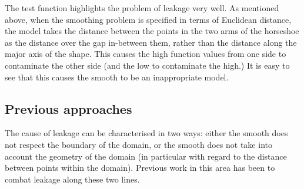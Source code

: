 \documentclass[10pt]{article}
\begin{document}
The test function highlights the problem of leakage very well. As mentioned above, when the smoothing problem is specified in terms of Euclidean distance, the model takes the distance between the points in the two arms of the horseshoe as the distance over the gap in-between them, rather than the distance along the major axis of the shape. This causes the high function values from one side to contaminate the other side (and the low to contaminate the high.) It is easy to see that this causes the smooth to be an inappropriate model.

\subsection{Previous approaches}

The cause of leakage can be characterised in two ways: either the smooth does not respect the boundary of the domain, or the smooth does not take into account the geometry of the domain (in particular with regard to the distance between points within the domain). Previous work in this area has been to combat leakage along these two lines. 

\end{document}
